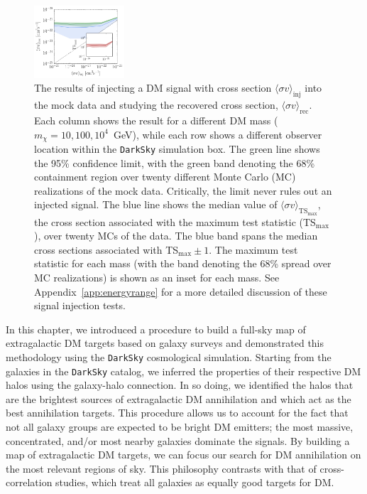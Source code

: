 \begin{figure}[t]
   \includegraphics[width=0.30\textwidth]{ch-darksky/plots//signal_recovery_10TeV_loc2}
   \caption{The results of injecting a DM signal with cross section $\langle \sigma v \rangle_\text{inj}$ into the mock data and studying the recovered cross section, $\langle \sigma v \rangle_\text{rec}$.  Each column shows the result for a different DM mass ($m_\chi = 10, 100, 10^4$~GeV), while each row shows a different observer location within the \texttt{DarkSky} simulation box.  The green line shows the 95\% confidence limit, with the green band denoting the 68\% containment region over twenty different Monte Carlo (MC) realizations of the mock data.  Critically, the limit never rules out an injected signal.  The blue line shows the median value of $\langle \sigma v\rangle_{\text{TS}_\text{max}}$, the cross section associated with the maximum test statistic (TS$_\text{max}$), over twenty MCs of the data. The blue band spans the median cross sections associated with TS$_\text{max} \pm 1$.  The maximum test statistic for each mass (with the band denoting the 68\% spread over MC realizations) is shown as an inset for each mass.  See Appendix~\ref{app:energyrange} for a more detailed discussion of these signal injection tests.  }
   \label{fig:DSinjsiglocs}
\end{figure}
 
In this chapter, we introduced a procedure to build a full-sky map of extragalactic DM targets based on galaxy surveys and demonstrated this methodology using the \texttt{DarkSky} cosmological simulation.   Starting from the galaxies in the \texttt{DarkSky} catalog, we inferred the properties of their respective DM halos using the galaxy-halo connection.  In so doing, we identified the halos that are the brightest sources of extragalactic DM annihilation and which act as the best annihilation targets.  This procedure allows us to account for the fact that not all galaxy groups are expected to be bright DM emitters; the most massive, concentrated, and/or most nearby galaxies dominate the signals.  By building a map of extragalactic DM targets, we can focus our search for DM annihilation on the most relevant regions of sky.  This philosophy contrasts with that of cross-correlation studies, which treat all galaxies as equally good targets for DM.   


